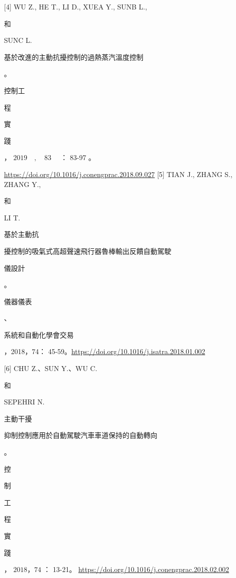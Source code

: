 \documentclass[10pt]{article}
\begin{document}
[4] WU Z., HE T., LI D., XUEA Y., SUNB L., \begin{CJK}{UTF8}{mj}和\end{CJK} SUNC L. \begin{CJK}{UTF8}{mj}基於改進的主動抗擾控制的過熱蒸汽溫度控制\end{CJK}。\begin{CJK}{UTF8}{mj}控制工\end{CJK}

\begin{CJK}{UTF8}{mj}程\end{CJK} \begin{CJK}{UTF8}{mj}實\end{CJK} \begin{CJK}{UTF8}{mj}踐\end{CJK} ， $2019 \quad, \quad 83 \quad$ ： 83-97 。

\href{https://doi.org/10.1016/j.conengprac.2018.09.027}{https://doi.org/10.1016/j.conengprac.2018.09.027}
[5] TIAN J., ZHANG S., ZHANG Y., \begin{CJK}{UTF8}{mj}和\end{CJK} LI T. \begin{CJK}{UTF8}{mj}基於主動抗\end{CJK} \begin{CJK}{UTF8}{mj}擾控制的吸氣式高超聲速飛行器魯棒輸出反饋自動駕駛\end{CJK} \begin{CJK}{UTF8}{mj}儀設計\end{CJK}。\begin{CJK}{UTF8}{mj}儀器儀表\end{CJK}、\begin{CJK}{UTF8}{mj}系統和自動化學會交易\end{CJK}，2018，74： 45-59。\href{https://doi.org/10.1016/j.isatra.2018.01.002}{https://doi.org/10.1016/j.isatra.2018.01.002}

[6] CHU Z.、SUN Y.、WU C. \begin{CJK}{UTF8}{mj}和\end{CJK} SEPEHRI N. \begin{CJK}{UTF8}{mj}主動干擾\end{CJK} \begin{CJK}{UTF8}{mj}抑制控制應用於自動駕駛汽車車道保持的自動轉向\end{CJK}。\begin{CJK}{UTF8}{mj}控\end{CJK} \begin{CJK}{UTF8}{mj}制\end{CJK} \begin{CJK}{UTF8}{mj}工\end{CJK} \begin{CJK}{UTF8}{mj}程\end{CJK} \begin{CJK}{UTF8}{mj}實\end{CJK} \begin{CJK}{UTF8}{mj}踐\end{CJK} ， $2018 ， 74$ ： 13-21。 \href{https://doi.org/10.1016/j.conengprac.2018.02.002}{https://doi.org/10.1016/j.conengprac.2018.02.002}
\end{document}
